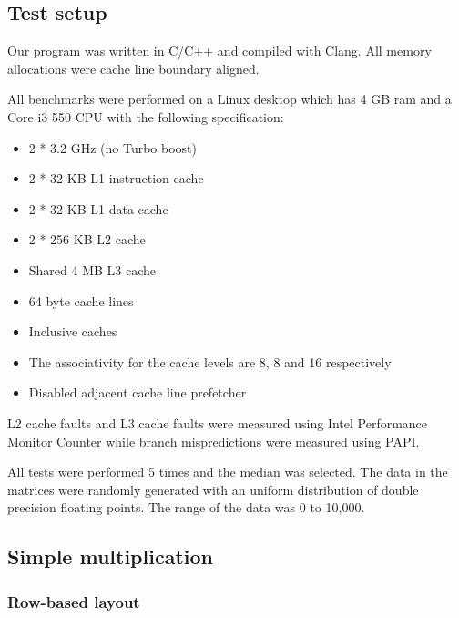 \subsection{Test setup}

Our program was written in C/C++ and compiled with Clang. All memory allocations were cache line boundary aligned.


All benchmarks were performed on a Linux desktop which has 4 GB ram and a Core i3 550 CPU with the following specification:

\begin{itemize}
\item 2 * 3.2 GHz (no Turbo boost)
\item 2 * 32 KB L1 instruction cache
\item 2 * 32 KB L1 data cache
\item 2 * 256 KB L2 cache
\item Shared 4 MB L3 cache
\item 64 byte cache lines
\item Inclusive caches
\item The associativity for the cache levels are 8, 8 and 16 respectively
\item Disabled adjacent cache line prefetcher
\end{itemize}

L2 cache faults and L3 cache faults were measured using Intel Performance Monitor Counter while branch mispredictions were measured using PAPI.

All tests were performed 5 times and the median was selected. The data in the matrices were randomly generated with
an uniform distribution of double precision floating points. The range of the data was 0 to
10,000.

\subsection{Simple multiplication}

\subsubsection{Row-based layout}

